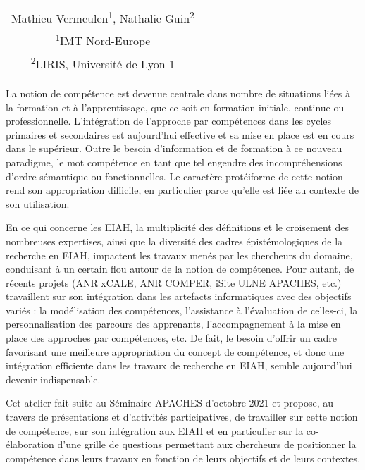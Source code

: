 \vspace{1em}
\begin{center}
	\begin{tabular}{@{}c@{}}
		Mathieu Vermeulen\textsuperscript{1}, Nathalie Guin\textsuperscript{2}\\
		\textsuperscript{1}IMT Nord-Europe\\
		\textsuperscript{2}LIRIS, Université de Lyon 1
	\end{tabular}
\end{center}

\vspace{2em}

La notion de compétence est devenue centrale dans nombre de situations liées à la formation et à l’apprentissage, que ce soit en formation initiale, continue ou professionnelle. L’intégration de l’approche par compétences dans les cycles primaires et secondaires est aujourd’hui effective et sa mise en place est en cours dans le supérieur. Outre le besoin d’information et de formation à ce nouveau paradigme, le mot compétence en tant que tel engendre des incompréhensions d’ordre sémantique ou fonctionnelles.  Le caractère protéiforme de cette notion rend son appropriation difficile, en particulier parce qu’elle est liée au contexte de son utilisation.

En ce qui concerne les EIAH, la multiplicité des définitions et le croisement des nombreuses expertises, ainsi que la diversité des cadres épistémologiques de la recherche en EIAH, impactent les travaux menés par les chercheurs du domaine, conduisant à un certain flou autour de la notion de compétence. Pour autant, de récents projets (ANR xCALE, ANR COMPER, iSite ULNE APACHES, etc.) travaillent sur son intégration dans les artefacts informatiques avec des objectifs variés : la modélisation des compétences, l’assistance à l’évaluation de celles-ci, la personnalisation des parcours des apprenants, l’accompagnement à la mise en place des approches par compétences, etc. De fait, le besoin d’offrir un cadre favorisant une meilleure appropriation du concept de compétence, et donc une intégration efficiente dans les travaux de recherche en EIAH, semble aujourd’hui devenir indispensable.

Cet atelier fait suite au Séminaire APACHES d’octobre 2021 et propose, au travers de présentations et d’activités participatives, de travailler sur cette notion de compétence, sur son intégration aux EIAH et en particulier sur la co-élaboration d’une grille de questions permettant aux chercheurs de positionner la compétence dans leurs travaux en fonction de leurs objectifs et de leurs contextes.

